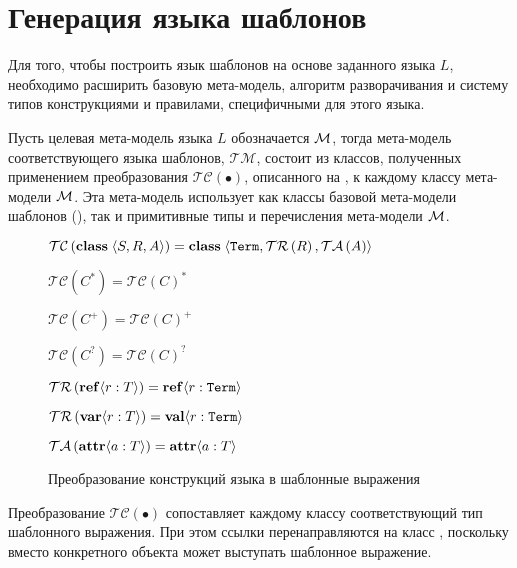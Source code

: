 {\section{Генерация языка шаблонов}

\newcommand{\TM}{\mathcal{TM}}
\newcommand{\TC}[1]{\mathcal{TC}\left(#1\right)}
\newcommand{\TR}[1]{\mathcal{TR}\left(#1\right)}
\newcommand{\TA}[1]{\mathcal{TA}\left(#1\right)}

Для того, чтобы построить язык шаблонов на основе заданного языка $L$, необходимо расширить базовую мета-модель, алгоритм разворачивания и систему типов конструкциями и правилами, специфичными для этого языка. 

Пусть целевая мета-модель языка $L$ обозначается $\mathcal{M}$, тогда мета-модель соответствующего языка шаблонов, $\TM$, состоит из классов, полученных применением преобразования $\TC{\bullet}$, описанного на , к каждому классу мета-модели $\mathcal{M}$. Эта мета-модель использует как классы базовой мета-модели шаблонов (), так и примитивные типы и перечисления мета-модели $\mathcal{M}$.

\begin{figure}[htbp]
	\centering
$\TC{\class{}{S}{R}{A}} = \class{}
			{\mathtt{Term}}{\TR{R}}{\TA{A}}$
			
$\TC{C^*} = \TC{C}^*$

$\TC{C^+} = \TC{C}^+$

$\TC{C^?} = \TC{C}^?$

$\TR{\reference{ref}{r}{T}} = \reference{ref}{r}{\mathtt{Term}}$

$\TR{\reference{var}{r}{T}} = \reference{val}{r}{\mathtt{Term}}$

$\TA{\attribute{a}{T}} = \attribute{a}{T}$
	\caption{Преобразование конструкций языка в шаблонные выражения}\label{TC}
\end{figure}

Преобразование $\TC{\bullet}$ сопоставляет каждому классу соответствующий тип шаблонного выражения. При этом ссылки перенаправляются на класс , поскольку вместо конкретного объекта может выступать шаблонное выражение.

}
